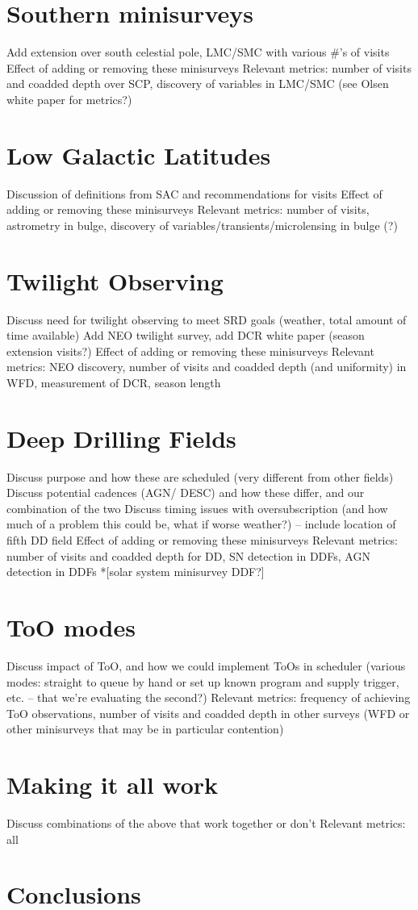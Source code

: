 \section{Southern minisurveys}
Add extension over south celestial pole, LMC/SMC with various #'s of visits
Effect of adding or removing these minisurveys
Relevant metrics: number of visits and coadded depth over SCP, discovery of variables in LMC/SMC (see Olsen white paper for metrics?)

\section{Low Galactic Latitudes}
Discussion of definitions from SAC and recommendations for visits
Effect of adding or removing these minisurveys
Relevant metrics: number of visits, astrometry in bulge, discovery of variables/transients/microlensing in bulge (?)

\section{Twilight Observing}
Discuss need for twilight observing to meet SRD goals (weather, total amount of time available)
Add NEO twilight survey, add DCR white paper (season extension visits?)
Effect of adding or removing these minisurveys
Relevant metrics: NEO discovery, number of visits and coadded depth (and uniformity) in WFD, measurement of DCR, season length

\section{Deep Drilling Fields}
Discuss purpose and how these are scheduled (very different from other fields)
Discuss potential cadences (AGN/ DESC) and how these differ, and our combination of the two
Discuss timing issues with oversubscription (and how much of a problem this could be, what if worse weather?) -- include location of fifth DD field
Effect of adding or removing these minisurveys
Relevant metrics: number of visits and coadded depth for DD, SN detection in DDFs, AGN detection in DDFs
*[solar system minisurvey DDF?]

\section{ToO modes}
Discuss impact of ToO, and how we could implement ToOs in scheduler (various modes: straight to queue by hand or set up known program and supply trigger, etc. -- that we're evaluating the second?)
Relevant metrics: frequency of achieving ToO observations, number of visits and coadded depth in other surveys (WFD or other minisurveys that may be in particular contention)

\section{Making it all work}
Discuss combinations of the above that work together or don't 
Relevant metrics: all

\section{Conclusions}